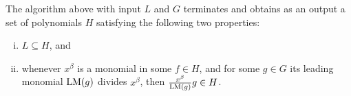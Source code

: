%
%
%

\begin{theorem}
    \label{thm:SymbolicPreprocessingResult}
    The algorithm above with input \(L\) and \(G\) terminates and obtains as an
    output a set of polynomials \(H\) satisfying the following two properties:
    \begin{enumerate}[(i)]
        \item \(L \subseteq H\), and
        \item whenever \(x^\beta\) is a monomial in some \(f \in H\), and for
        some \(g \in G\) its leading monomial \(\mathrm{LM}(g)\) divides
        \(x^\beta\), then \(\frac{x^\beta}{\mathrm{LM}(g)} g \in H\).
    \end{enumerate}
\end{theorem}


